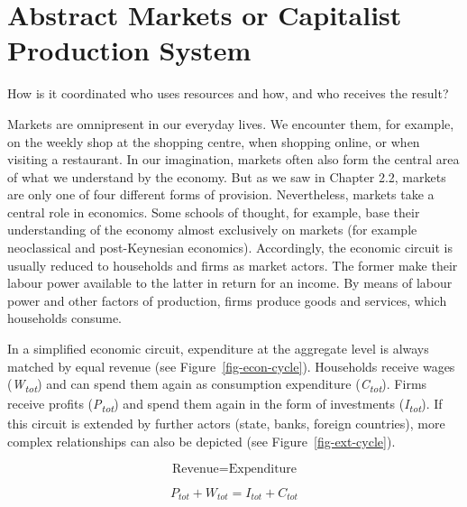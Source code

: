\documentclass[
  british,
  a4paper,
  DIV=11,
  numbers=noendperiod,
  oneside,
  openany]{scrreprt}
\begin{document}
\section{Abstract Markets or Capitalist Production
System}\label{abstract-markets-or-capitalist-production-system}

\begin{tcolorbox}[enhanced jigsaw, arc=.35mm, bottomrule=.15mm, bottomtitle=1mm, breakable, colback=white, colbacktitle=quarto-callout-note-color!10!white, colframe=quarto-callout-note-color-frame, coltitle=black, left=2mm, leftrule=.75mm, opacityback=0, opacitybacktitle=0.6, rightrule=.15mm, title={Guiding question}, titlerule=0mm, toprule=.15mm, toptitle=1mm]

How is it coordinated who uses resources and how, and who receives the
result?

\end{tcolorbox}

Markets are omnipresent in our everyday lives. We encounter them, for
example, on the weekly shop at the shopping centre, when shopping
online, or when visiting a restaurant. In our imagination, markets often
also form the central area of what we understand by the economy. But as
we saw in Chapter 2.2, markets are only one of four different forms of
provision. Nevertheless, markets take a central role in economics. Some
schools of thought, for example, base their understanding of the economy
almost exclusively on markets (for example neoclassical and
post-Keynesian economics). Accordingly, the economic circuit is usually
reduced to households and firms as market actors. The former make their
labour power available to the latter in return for an income. By means
of labour power and other factors of production, firms produce goods and
services, which households consume.

In a simplified economic circuit, expenditure at the aggregate level is
always matched by equal revenue (see Figure~\ref{fig-econ-cycle}).
Households receive wages (\emph{W\textsubscript{tot}}) and can spend
them again as consumption expenditure (\emph{C\textsubscript{tot}}).
Firms receive profits (\emph{P\textsubscript{tot}}) and spend them again
in the form of investments (\emph{I\textsubscript{tot}}). If this
circuit is extended by further actors (state, banks, foreign countries),
more complex relationships can also be depicted (see
Figure~\ref{fig-ext-cycle}).

\[\text{Revenue} = \text{Expenditure}\]

\[P_{tot} + W_{tot} = I_{tot} + C_{tot}\]
\end{document}
